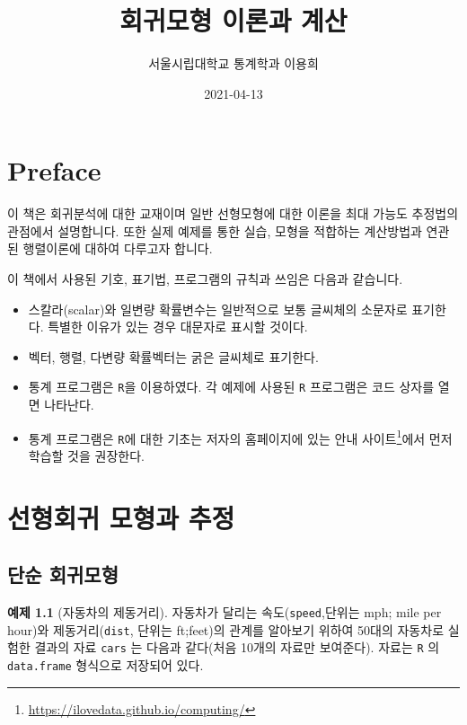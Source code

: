 \documentclass[
]{book}
\title{회귀모형 이론과 계산}
\author{서울시립대학교 통계학과 이용희}
\date{2021-04-13}
\makeatletter
\providecommand{\tightlist}{%
  \setlength{\itemsep}{0pt}\setlength{\parskip}{0pt}}
\renewcommand{\href}[2]{#2\footnote{\url{#1}}}
\newenvironment{kframe}{%
\medskip{}
\setlength{\fboxsep}{.8em}
 \def\at@end@of@kframe{}%
 \ifinner\ifhmode%
  \def\at@end@of@kframe{\end{minipage}}%
  \begin{minipage}{\columnwidth}%
 \fi\fi%
 \def\FrameCommand##1{\hskip\@totalleftmargin \hskip-\fboxsep
 \colorbox{shadecolor}{##1}\hskip-\fboxsep
     \hskip-\linewidth \hskip-\@totalleftmargin \hskip\columnwidth}%
 \MakeFramed {\advance\hsize-\width
   \@totalleftmargin\z@ \linewidth\hsize
   \@setminipage}}%
 {\par\unskip\endMakeFramed%
 \at@end@of@kframe}
\newenvironment{rmdblock}[1]
  {
  \begin{itemize}
  \renewcommand{\labelitemi}{
    \raisebox{-.7\height}[0pt][0pt]{
      {\setkeys{Gin}{width=3em,keepaspectratio}\texttt{[image: images/\#1]}}
    }
  }
  \setlength{\fboxsep}{1em}
  \begin{kframe}
  \item
  }
  {
  \end{kframe}
  \end{itemize}
  }
\newenvironment{rmdimportant}
  {\begin{rmdblock}{important}}
  {\end{rmdblock}}
\theoremstyle{definition}
\theoremstyle{definition}
\newtheorem{example}{예제}[chapter]
\theoremstyle{definition}
\theoremstyle{remark}
\makeatother
\begin{document}
\maketitle

{
\setcounter{tocdepth}{1}
\tableofcontents
}
\hypertarget{preface}{%
\chapter*{Preface}\label{preface}}


이 책은 회귀분석에 대한 교재이며 일반 선형모형에 대한 이론을 최대 가능도 추정법의 관점에서 설명합니다. 또한 실제 예제를 통한 실습, 모형을 적합하는 계산방법과 연관된 행렬이론에 대하여 다루고자 합니다.

\begin{rmdimportant}
이 책에서 사용된 기호, 표기법, 프로그램의 규칙과 쓰임은 다음과 같습니다.

\begin{itemize}
\tightlist
\item
  스칼라(scalar)와 일변량 확률변수는 일반적으로 보통 글씨체의 소문자로 표기한다. 특별한 이유가 있는 경우 대문자로 표시할 것이다.
\item
  벡터, 행렬, 다변량 확률벡터는 굵은 글씨체로 표기한다.
\item
  통계 프로그램은 \texttt{R}을 이용하였다. 각 예제에 사용된 \texttt{R} 프로그램은 코드 상자를 열면 나타난다.
\item
  통계 프로그램은 \texttt{R}에 대한 기초는 저자의 홈페이지에 있는 \href{https://ilovedata.github.io/computing/}{안내 사이트}에서 먼저 학습할 것을 권장한다.
\end{itemize}
\end{rmdimportant}

\mainmatter

\hypertarget{lse}{%
\chapter{선형회귀 모형과 추정}\label{lse}}

\hypertarget{uxb2e8uxc21c-uxd68cuxadc0uxbaa8uxd615}{%
\section{단순 회귀모형}\label{uxb2e8uxc21c-uxd68cuxadc0uxbaa8uxd615}}

\begin{example}[자동차의 제동거리]
\protect\hypertarget{exm:unnamed-chunk-4}{}{\label{exm:unnamed-chunk-4} {} }
자동차가 달리는 속도(\texttt{speed},단위는 mph; mile per hour)와 제동거리(\texttt{dist}, 단위는 ft;feet)의 관계를 알아보기 위하여 50대의 자동차로 실험한 결과의 자료 \texttt{cars} 는 다음과 같다(처음 10개의 자료만 보여준다). 자료는 \texttt{R} 의 \texttt{data.frame} 형식으로 저장되어 있다.
\end{example}
\end{document}
